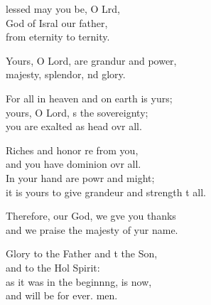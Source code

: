 \settowidth{\versewidth}{it is yours to give grandeur and strength to all.}
\begin{psalmverse}%
  \begin{patverse}
    lessed may you be, O Lrd,\Flex\\
God of Isral our father,\Med\\
from eternity to ternity.

Yours, O Lord, are grandur and power,\Med\\
majesty, splendor, nd glory.

For all in heaven and on earth is yurs;\Flex\\
yours, O Lord, \pointup{\i}s the sovereignty;\Med\\
you are exalted as head ovr all.

Riches and honor re from you,\Med\\
and you have dominion ovr all.\\
In your hand are powr and might;\Med\\
it is yours to give grandeur and strength t all.

Therefore, our God, we g\pointup{\i}ve you thanks\Med\\
and we praise the majesty of yur name.

Glory to the Father and t the Son,\Med\\
    and to the Hol Spirit:\\
as it was in the beginn\pointup{\i}ng, is now,\Med\\
    and will be for ever. men.
  \end{patverse}
\end{psalmverse}
